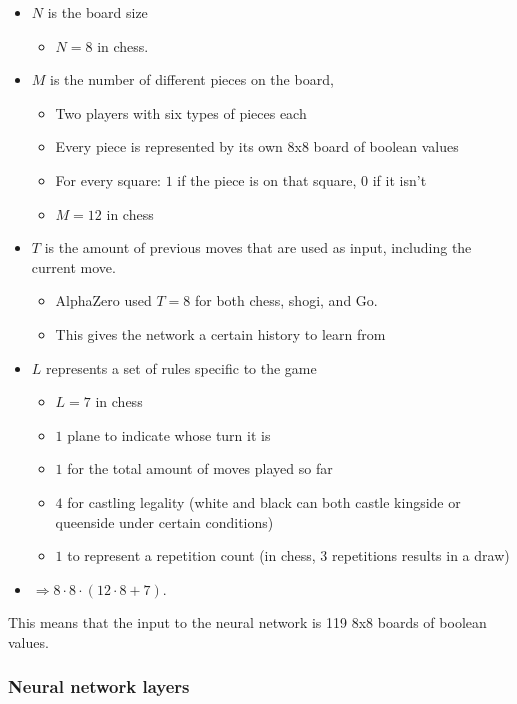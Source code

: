 \documentclass{article}
\begin{document}
\begin{itemize}
    \item $N$ is the board size
    \begin{itemize}
        \item $N = 8$ in chess.
    \end{itemize}
    \item $M$ is the number of different pieces on the board, 
    \begin{itemize}
        \item Two players with six types of pieces each
        \item Every piece is represented by its own 8x8 board of boolean values
        \item For every square: $1$ if the piece is on that square, $0$ if it isn't
        \item $M = 12$ in chess
    \end{itemize}
    \item $T$ is the amount of previous moves that are used as input, including the current move. 
    \begin{itemize}
        \item AlphaZero used $T = 8$ for both chess, shogi, and Go.
        \item This gives the network a certain history to learn from
    \end{itemize}
    \item $L$ represents a set of rules specific to the game
    \begin{itemize}
        \item $L = 7$ in chess
        \item $1$ plane to indicate whose turn it is
        \item $1$ for the total amount of moves played so far
        \item $4$ for castling legality (white and black can both castle kingside or queenside under certain conditions)
        \item $1$ to represent a repetition count (in chess, 3 repetitions results in a draw)
    \end{itemize}
    \item $\Rightarrow 8 \cdot 8 \cdot (12 \cdot 8 + 7)$. 
\end{itemize}

This means that the input to the neural network is 119 8x8 boards of boolean values.

\subsubsection{Neural network layers}
\end{document}
